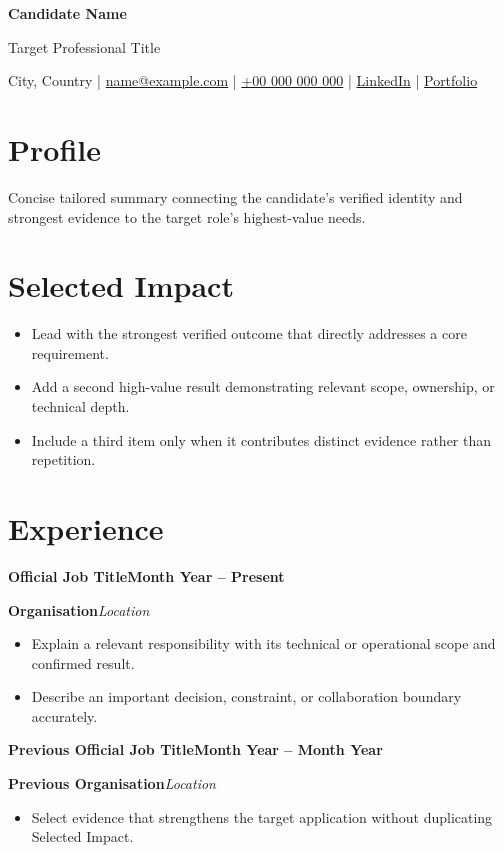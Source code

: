 \documentclass[10pt,a4paper]{article}
\newcommand{\role}[4]{%
  {\large\bfseries #1}\hfill\textbf{#2}\par
  {\color{accent}\textbf{#3}}\hfill\textit{#4}\par\vspace{-2pt}
}
\begin{document}
\color{body}
\raggedright

{\fontsize{25}{28}\selectfont\bfseries Candidate Name}\par
\vspace{1pt}
{\large\color{accent}Target Professional Title}\par
\vspace{4pt}
City, Country \enspace|\enspace
\href{mailto:name@example.com}{name@example.com} \enspace|\enspace
\href{tel:+00000000000}{+00 000 000 000} \enspace|\enspace
\href{https://www.linkedin.com/}{LinkedIn} \enspace|\enspace
\href{https://portfolio.example.com/}{Portfolio}

\section{Profile}
Concise tailored summary connecting the candidate's verified identity and strongest evidence to the target role's highest-value needs.

\section{Selected Impact}
\begin{itemize}
  \item Lead with the strongest verified outcome that directly addresses a core requirement.
  \item Add a second high-value result demonstrating relevant scope, ownership, or technical depth.
  \item Include a third item only when it contributes distinct evidence rather than repetition.
\end{itemize}

\section{Experience}
\role{Official Job Title}{Month Year -- Present}{Organisation}{Location}
\begin{itemize}
  \item Explain a relevant responsibility with its technical or operational scope and confirmed result.
  \item Describe an important decision, constraint, or collaboration boundary accurately.
\end{itemize}

\role{Previous Official Job Title}{Month Year -- Month Year}{Previous Organisation}{Location}
\begin{itemize}
  \item Select evidence that strengthens the target application without duplicating Selected Impact.
\end{itemize}
\end{document}
